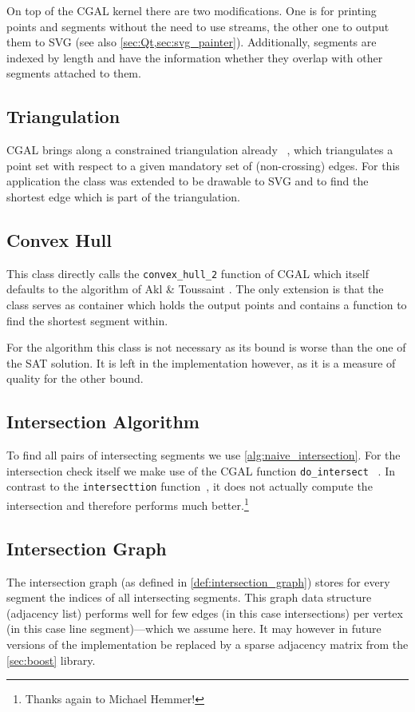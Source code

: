 On top of the \gls{CGAL} kernel there are two modifications. One is for
printing points and segments without the need to use streams, the
other one to output them to SVG (see also
\cref{sec:Qt,sec:svg_painter}). Additionally, segments are indexed by
length and have the information whether they overlap with other
segments attached to them.

\subsection{Triangulation}
\gls{CGAL} brings along a constrained triangulation already~%
\cite{cgal_manual_constrained_triangulation},
which triangulates a point set with respect to a given mandatory set
of (non-crossing) edges. For this application the class was extended
to be drawable to SVG and to find the shortest edge which is part of
the triangulation.

\subsection{Convex Hull}
This class directly calls the \verb|convex_hull_2| function of \gls{CGAL}
\cite{cgal_manual_convex_hull} which itself defaults to the algorithm
of Akl \& Toussaint \cite{convex_hull}. The only extension is that
the class serves as container
which holds the output points and contains a function to find the 
shortest segment within.

For the algorithm this class is not necessary as its bound is worse
than the one of the SAT solution. It is left in the implementation
however, as it is a measure of quality for the other bound.

\subsection{Intersection Algorithm}
To find all pairs of intersecting segments we use 
\cref{alg:naive_intersection}. For the intersection check itself
we make use of the \gls{CGAL} function \verb|do_intersect|%
~\cite{cgal_manual_do_intersect}. In contrast to the
\verb|intersecttion| function~\cite{cgal_manual_intersection}, it
does not actually compute the intersection and therefore performs
much better.\footnote{Thanks again to Michael Hemmer!}

\subsection{Intersection Graph}
The intersection graph (as defined in \cref{def:intersection_graph})
stores for every segment the indices of all intersecting segments.
This graph data structure (adjacency list) performs well for few
edges (in this case intersections) per vertex (in this case line
segment)---which we assume here. It may however in future versions
of the implementation be replaced by a sparse adjacency matrix from
the \cref{sec:boost} library.

